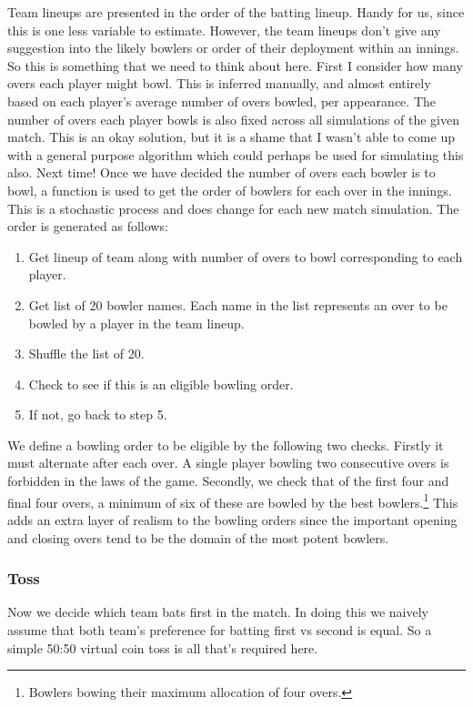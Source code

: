 Team lineups are presented in the order of the batting lineup. Handy for us, since this is one less variable to estimate. However, the team lineups don't give any suggestion into the likely bowlers or order of their deployment within an innings. So this is something that we need to think about here. First I consider how many overs each player might bowl. This is inferred manually, and almost entirely based on each player's average number of overs bowled, per appearance. The number of overs each player bowls is also fixed across all simulations of the given match. This is an okay solution, but it is a shame that I wasn't able to come up with a general purpose algorithm which could perhaps be used for simulating this also. Next time! Once we have decided the number of overs each bowler is to bowl, a function is used to get the order of bowlers for each over in the innings. This is a stochastic process and does change for each new match simulation. The order is generated as follows:

\begin{enumerate}
    \itemsep-0.25em
    \item Get lineup of team along with number of overs to bowl corresponding to each player.
    \item Get list of 20 bowler names. Each name in the list represents an over to be bowled by a player in the team lineup.
    \item Shuffle the list of 20.
    \item Check to see if this is an eligible bowling order.
    \item If not, go back to step 5.
\end{enumerate}

We define a bowling order to be eligible by the following two checks. Firstly it must alternate after each over. A single player bowling two consecutive overs is forbidden in the laws of the game. Secondly, we check that of the first four and final four overs, a minimum of six of these are bowled by the best bowlers.\footnote{Bowlers bowing their maximum allocation of four overs.} This adds an extra layer of realism to the bowling orders since the important opening and closing overs tend to be the domain of the most potent bowlers.

\subsubsection{Toss}

Now we decide which team bats first in the match. In doing this we naively assume that both team's preference for batting first vs second is equal. So a simple 50:50 virtual coin toss is all that's required here.

